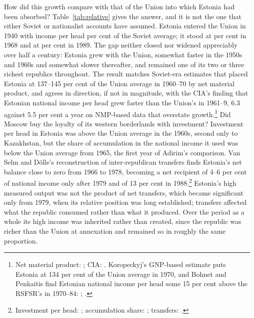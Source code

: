 How did this growth compare with that of the Union into which Estonia had been absorbed? Table~\ref{tab:relative} gives the answer, and it is not the one that either Soviet or nationalist accounts have assumed. Estonia entered the Union in 1940 with income per head  per cent of the Soviet average; it stood at  per cent in 1968 and at  per cent in 1989. The gap neither closed nor widened appreciably over half a century: Estonia grew with the Union, somewhat faster in the 1950s and 1960s and somewhat slower thereafter, and remained one of its two or three richest republics throughout. The result matches Soviet-era estimates that placed Estonia at 137--145 per cent of the Union average in 1960--70 by net material product, and agrees in direction, if not in magnitude, with the CIA's finding that Estonian national income per head grew faster than the Union's in 1961--9, 6.3 against 5.5 per cent a year on NMP-based data that overstate growth.\footnote{Net material product: \autocite[169, 174]{schroeder1973}; CIA: \autocite[8--10]{cia1972}. Koropeckyj's GNP-based estimate puts Estonia at 134 per cent of the Union average in 1970, and Bohnet and Penkaitis find Estonian national income per head some 15 per cent above the RSFSR's in 1970--84: \autocite[63--4]{bs_livingstandards1976}; \autocite[35--6]{bs_livingstandards1988}.} Did Moscow buy the loyalty of its western borderlands with investment? Investment per head in Estonia was above the Union average in the 1960s, second only to Kazakhstan, but the share of accumulation in the national income it used was below the Union average from 1965, the first year of Adirim's comparison. Van Selm and Dölle's reconstruction of inter-republican transfers finds Estonia's net balance close to zero from 1966 to 1978, becoming a net recipient of 4--6 per cent of national income only after 1979 and of 13 per cent in 1988.\footnote{Investment per head: \autocite[22--9]{cia1972}; accumulation share: \autocite[53]{adirim1988}; transfers: \autocite[136--40]{vanselmdolle1993}.} Estonia's high measured output was not the product of net transfers, which became significant only from 1979, when its relative position was long established; transfers affected what the republic consumed rather than what it produced. Over the period as a whole its high income was inherited rather than created, since the republic was richer than the Union at annexation and remained so in roughly the same proportion.

